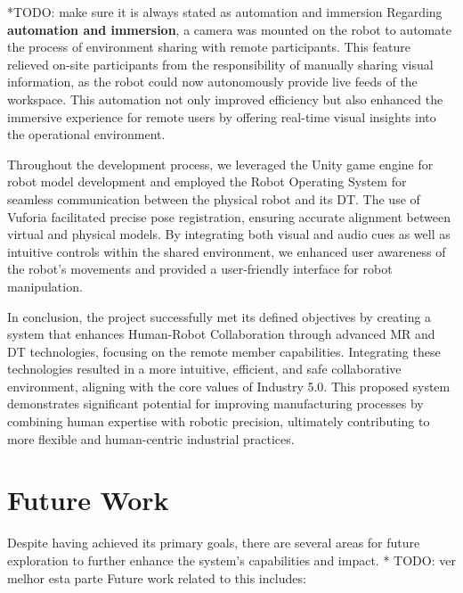 *TODO: make sure it is always stated as automation and immersion
Regarding \textbf{automation and immersion}, a camera was mounted on the robot to automate the process of environment sharing with remote participants. This feature relieved on-site participants from the responsibility of manually sharing visual information, as the robot could now autonomously provide live feeds of the workspace. This automation not only improved efficiency but also enhanced the immersive experience for remote users by offering real-time visual insights into the operational environment.

Throughout the development process, we leveraged the Unity game engine for robot model development and employed the Robot Operating System for seamless communication between the physical robot and its \ac{DT}. The use of Vuforia facilitated precise pose registration, ensuring accurate alignment between virtual and physical models. By integrating both visual and audio cues as well as intuitive controls within the shared environment, we enhanced user awareness of the robot's movements and provided a user-friendly interface for robot manipulation.


In conclusion, the project successfully met its defined objectives by creating a system that enhances Human-Robot Collaboration through advanced \ac{MR} and \ac{DT} technologies, focusing on the remote member capabilities. Integrating these technologies resulted in a more intuitive, efficient, and safe collaborative environment, aligning with the core values of Industry 5.0. This proposed system demonstrates significant potential for improving manufacturing processes by combining human expertise with robotic precision, ultimately contributing to more flexible and human-centric industrial practices.

\section{Future Work}

Despite having achieved its primary goals, there are several areas for future exploration to further enhance the system's capabilities and impact.
* TODO: ver melhor esta parte
Future work related to this includes:

